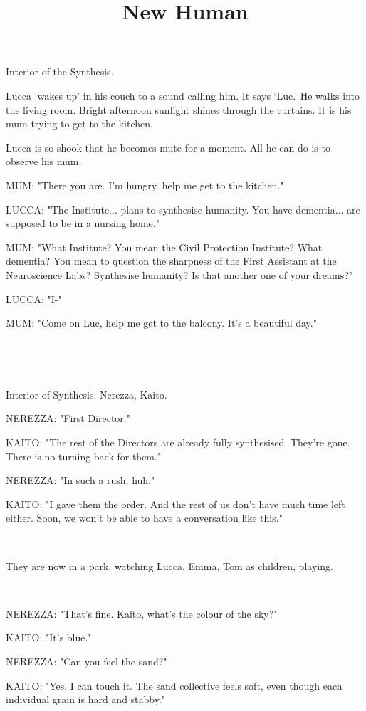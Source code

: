 \documentclass[11pt]{article}
\begin{document}
\ttfamily
\title{New Human}
\maketitle

Interior of the Synthesis.


Lucca `wakes up' in his couch to a sound calling him. 
It says `Luc.'
He walks into the living room. 
Bright afternoon sunlight shines through the curtains.
It is his mum trying to get to the kitchen.

Lucca is so shook that he becomes mute for a moment.
All he can do is to observe his mum.

MUM: "There you are.
I'm hungry.
help me get to the kitchen."

LUCCA: "The Institute... plans to synthesise humanity.
You have dementia... are supposed to be in a nursing home."

MUM: "What Institute? You mean the Civil Protection Institute? What dementia?
You mean to question the sharpness of the First Assistant at the Neuroscience Labs?
Synthesise humanity?
Is that another one of your dreams?"

LUCCA: "I-"

MUM: "Come on Luc, help me get to the balcony. It's a beautiful day."

\ 

\ 

Interior of Synthesis.
Nerezza, Kaito. 

NEREZZA: "First Director."

KAITO: "The rest of the Directors are already fully synthesised. 
They're gone.
There is no turning back for them."

NEREZZA: "In such a rush, huh."

KAITO: "I gave them the order.
And the rest of us don't have much time left either.
Soon, we won't be able to have a conversation like this."

\ 

They are now in a park, watching Lucca, Emma, Tom as children, playing.

\ 

NEREZZA: "That's fine.
Kaito, what's the colour of the sky?"

KAITO: "It's blue."

NEREZZA: "Can you feel the sand?"

KAITO: "Yes. I can touch it.
The sand collective feels soft, even though each individual grain is hard and stabby."
\end{document}
